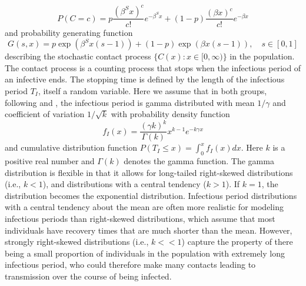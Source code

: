 \documentclass{imammb}
\numberwithin{equation}{section}
\begin{document}
\begin{equation}\label{eqn:contactpmf}
  P(C=c)=  p \frac{(\beta^S x)^c}{c!} e^{-\beta^S x} +(1-p)\frac{(\beta x)^c }{c!} e^{-\beta x}
\end{equation}
and probability generating function
\begin{equation}\label{eqn:contactpgf}
    G(s,x) = p \exp \left ( \beta^S x (s-1) \right)  + (1-p) \exp  \left (\beta x (s-1)\right), \quad s \in [0,1]
\end{equation}
describing the stochastic contact process $\{C(x): x \in [0, \infty)\}$ in the population. The contact process is a counting process that stops when the infectious period of an infective ends. The stopping time is defined by the length of the infectious period $T_I$, itself a random variable. Here we assume that in both groups, following \citet{Anderson1980-vq} and  \citet{Britton2009-tt}, the infectious period is gamma distributed with mean $1/\gamma$ and coefficient of variation $1/\sqrt{k}$ with probability density function
\begin{equation}\label{eqn:gammapdf}
f_I(x) = \frac{(\gamma k)^k}{\Gamma(k)} x^{k-1}e^{-k \gamma x}
\end{equation}
and cumulative distribution function $P(T_I \leq x) = \int_0^x f_I(x) dx$. Here $k$ is a positive real number and $\Gamma(k)$ denotes the gamma function. The gamma distribution is flexible in that it allows for long-tailed right-skewed distributions (i.e., $k<1$), and distributions with a central tendency ($k>1$). If $k=1$, the distribution becomes the exponential distribution. Infectious period distributions with a central tendency about the mean are often more realistic for modeling infectious periods \citep{Lloyd2001-eq, Wearing2005-oo, Keeling2008-sh} than right-skewed distributions, which assume that most individuals have recovery times that are much shorter than the mean. However, strongly right-skewed distributions (i.e., $k<<1$) capture the property of there being a small proportion of individuals in the population with extremely long infectious period, who could therefore make many contacts leading to transmission over the course of being infected.
\end{document}
